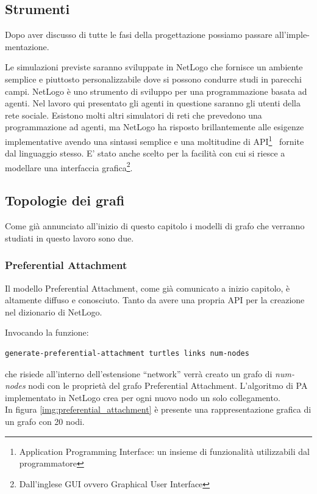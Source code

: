 \subsection{Strumenti}


Dopo aver discusso di tutte le fasi della progettazione possiamo passare all'imple-mentazione.

Le simulazioni previste saranno sviluppate in NetLogo che fornisce un ambiente semplice e piuttosto 
personalizzabile dove si possono condurre studi in parecchi campi.
NetLogo è uno strumento di sviluppo per una programmazione basata ad agenti.
Nel lavoro qui presentato gli agenti in questione saranno gli utenti della rete sociale.
Esistono molti altri simulatori di reti che prevedono una programmazione ad agenti, ma NetLogo
ha risposto brillantemente alle esigenze implementative avendo una sintassi semplice e una moltitudine di
API\footnote{\scriptsize Application Programming Interface: un insieme di funzionalità utilizzabili dal programmatore
}~\cite{biblio:netlogo_dictionary} fornite dal linguaggio stesso. 
E' stato anche scelto per la facilità con cui si riesce a modellare una 
interfaccia grafica\footnote{\scriptsize Dall’inglese GUI ovvero Graphical User Interface}.



\subsection{Topologie dei grafi}
\label{section:graph_topologies}


Come già annunciato all'inizio di questo capitolo i modelli di grafo che verranno studiati in questo lavoro
sono due.


\subsubsection{Preferential Attachment}
\label{section:graph_topologies_pa}
Il modello Preferential Attachment, come già comunicato a inizio capitolo, è altamente diffuso e conosciuto.
Tanto da avere una propria API per la creazione nel dizionario di NetLogo. 

Invocando la funzione:
\begin{lstlisting}[label=some-code, style=custom_code]
 generate-preferential-attachment turtles links num-nodes
\end{lstlisting}

che risiede all'interno dell'estensione ``network'' verrà creato un grafo di \emph{num-nodes} nodi con le proprietà 
del grafo Preferential Attachment. L'algoritmo di PA implementato in NetLogo crea per ogni nuovo nodo un solo collegamento. \\
In figura \ref{img:preferential_attachment} è presente una rappresentazione grafica di un grafo con 20 nodi.

